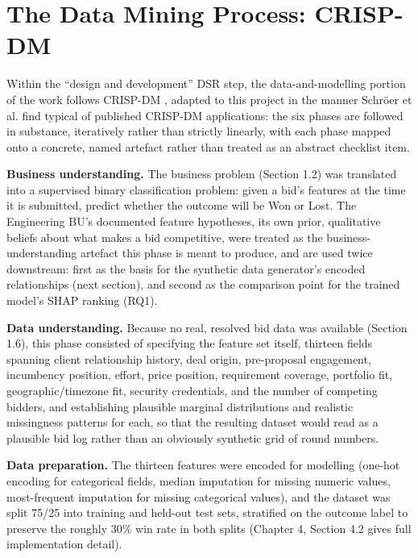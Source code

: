 \hypertarget{the-data-mining-process-crisp-dm}{%
\section{The Data Mining Process:
CRISP-DM}\label{the-data-mining-process-crisp-dm}}

Within the ``design and development'' DSR step, the data-and-modelling
portion of the work follows CRISP-DM \citep{chapman2000crispdm}, adapted
to this project in the manner Schröer et al.
\citep{schroer2021systematic} find typical of published CRISP-DM
applications: the six phases are followed in substance, iteratively
rather than strictly linearly, with each phase mapped onto a concrete,
named artefact rather than treated as an abstract checklist item.

\textbf{Business understanding.} The business problem (Section 1.2) was
translated into a supervised binary classification problem: given a
bid's features at the time it is submitted, predict whether the outcome
will be Won or Lost. The Engineering BU's documented feature hypotheses,
its own prior, qualitative beliefs about what makes a bid competitive,
were treated as the business-understanding artefact this phase is meant
to produce, and are used twice downstream: first as the basis for the
synthetic data generator's encoded relationships (next section), and
second as the comparison point for the trained model's SHAP ranking
(RQ1).

\textbf{Data understanding.} Because no real, resolved bid data was
available (Section 1.6), this phase consisted of specifying the feature
set itself, thirteen fields spanning client relationship history, deal
origin, pre-proposal engagement, incumbency position, effort, price
position, requirement coverage, portfolio fit, geographic/timezone fit,
security credentials, and the number of competing bidders, and
establishing plausible marginal distributions and realistic missingness
patterns for each, so that the resulting dataset would read as a
plausible bid log rather than an obviously synthetic grid of round
numbers.

\textbf{Data preparation.} The thirteen features were encoded for
modelling (one-hot encoding for categorical fields, median imputation
for missing numeric values, most-frequent imputation for missing
categorical values), and the dataset was split 75/25 into training and
held-out test sets, stratified on the outcome label to preserve the
roughly 30\% win rate in both splits (Chapter 4, Section 4.2 gives full
implementation detail).

